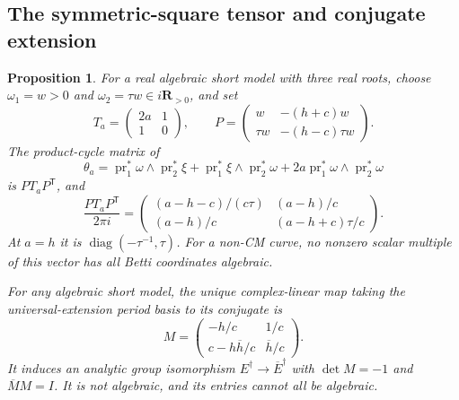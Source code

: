 \documentclass[11pt]{article}
\newtheorem{proposition}[theorem]{Proposition}
\theoremstyle{definition}\newtheorem{definition}[theorem]{Definition}
\theoremstyle{remark}\newtheorem{remark}[theorem]{Remark}
\newcommand{\R}{\mathbf R}\newcommand{\C}{\mathbf C}
\begin{document}
\subsection{The symmetric-square tensor and conjugate extension}
\begin{proposition}\label{prop:symmetric-conjugate}
For a real algebraic short model with three real roots, choose $\omega_1=w>0$ and $\omega_2=\tau w\in i\R_{>0}$, and set
\[
 T_a=\begin{pmatrix}2a&1\\1&0\end{pmatrix},\qquad
 P=\begin{pmatrix}w&-(h+c)w\\ \tau w&-(h-c)\tau w\end{pmatrix}.
\]
The product-cycle matrix of
\[
 \theta_a=\operatorname{pr}_1^*\omega\wedge\operatorname{pr}_2^*\xi
 +\operatorname{pr}_1^*\xi\wedge\operatorname{pr}_2^*\omega
 +2a\operatorname{pr}_1^*\omega\wedge\operatorname{pr}_2^*\omega
\]
is $PT_aP^{\mathsf T}$, and
\[
 \frac{PT_aP^{\mathsf T}}{2\pi i}
 =\begin{pmatrix}
 (a-h-c)/(c\tau)&(a-h)/c\\
 (a-h)/c&(a-h+c)\tau/c
 \end{pmatrix}.
\]
At $a=h$ it is $\operatorname{diag}(-\tau^{-1},\tau)$. For a non-CM curve, no nonzero scalar multiple of this vector has all Betti coordinates algebraic.

For any algebraic short model, the unique complex-linear map taking the universal-extension period basis to its conjugate is
\[
 M=\begin{pmatrix}-h/c&1/c\\c-h\overline h/c&\overline h/c\end{pmatrix}.
\]
It induces an analytic group isomorphism $E^\dagger\to\overline E^\dagger$ with $\det M=-1$ and $\overline M M=I$. It is not algebraic, and its entries cannot all be algebraic.
\end{proposition}
\end{document}
